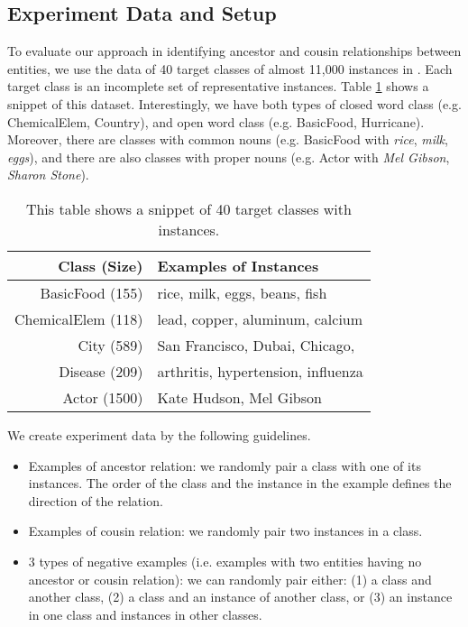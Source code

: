 \subsection{Experiment Data and Setup}
To evaluate our approach in identifying ancestor and cousin relationships between entities, we use the data of 40 target classes of almost 11,000 instances in \cite{citeulike:1587018}. Each target class is an incomplete set of representative instances. Table \ref{table:class-instance} shows a snippet of this dataset. Interestingly, we have both types of closed word class (e.g. ChemicalElem, Country), and open word class (e.g. BasicFood, Hurricane). Moreover, there are classes with common nouns (e.g. BasicFood with {\em rice}, {\em milk}, {\em eggs}), and there are also classes with proper nouns (e.g. Actor with {\em Mel Gibson}, {\em Sharon Stone}).

\begin{table}[h]
  \centering
{\small
  \begin{tabular}{|r|l|}
    \hline
    Class (Size) & Examples of Instances \\
    \hline
    \hline
    BasicFood (155) & rice, milk, eggs, beans, fish \\
    \hline
    ChemicalElem (118) & lead, copper, aluminum, calcium \\
    \hline
    City (589) & San Francisco, Dubai, Chicago, \\
    \hline
    Disease (209) & arthritis, hypertension, influenza \\
    \hline
    Actor (1500) & Kate Hudson, Mel Gibson \\
    \hline
  \end{tabular}
  \caption{This table shows a snippet of 40 target classes with instances.}
}
  \label{table:class-instance}
\end{table}

We create experiment data by the following guidelines.

\begin{itemize}
\item Examples of ancestor relation: we randomly pair a class with one of its instances. The order of the class and the instance in the example defines the direction of the relation.
\item Examples of cousin relation: we randomly pair two instances in a class.
\item 3 types of negative examples (i.e. examples with two entities having no ancestor or cousin relation): we can randomly pair either: (1) a class and another class, (2) a class and an instance of another class, or (3) an instance in one class and instances in other classes.
\end{itemize}

